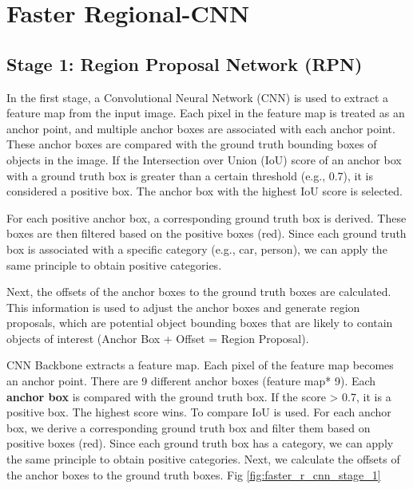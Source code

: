 \section{Faster Regional-CNN}

\subsection{Stage 1: Region Proposal Network (RPN)}
In the first stage, a Convolutional Neural Network (CNN) is used to extract a feature map from the input image. Each pixel in the feature map is treated as an anchor point, and multiple anchor boxes are associated with each anchor point. These anchor boxes are compared with the ground truth bounding boxes of objects in the image. If the Intersection over Union (IoU) score of an anchor box with a ground truth box is greater than a certain threshold (e.g., 0.7), it is considered a positive box. The anchor box with the highest IoU score is selected.

For each positive anchor box, a corresponding ground truth box is derived. These boxes are then filtered based on the positive boxes (red). Since each ground truth box is associated with a specific category (e.g., car, person), we can apply the same principle to obtain positive categories.

Next, the offsets of the anchor boxes to the ground truth boxes are calculated. This information is used to adjust the anchor boxes and generate region proposals, which are potential object bounding boxes that are likely to contain objects of interest (Anchor Box + Offset = Region Proposal).

CNN Backbone extracts a feature map. Each pixel of the feature map becomes an anchor point. There are 9 different anchor boxes (feature map* 9). Each \textbf{anchor box} is compared with the ground truth box. If the score \textgreater{} 0.7, it is a positive box. The highest score wins. To compare IoU is used.
For each anchor box, we derive a corresponding ground truth box and filter them based on positive boxes (red). Since each ground truth box has a category, we can apply the same principle to obtain positive categories. Next, we calculate the offsets of the anchor boxes to the ground truth boxes. Fig \ref{fig:faster_r_cnn_stage_1}

